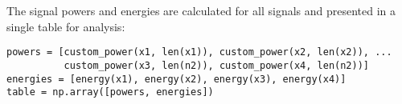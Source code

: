 
\item[(f)]
The signal powers and energies are calculated for all signals and presented in a single table for analysis:

\begin{verbatim}
powers = [custom_power(x1, len(x1)), custom_power(x2, len(x2)), ...
          custom_power(x3, len(n2)), custom_power(x4, len(n2))]
energies = [energy(x1), energy(x2), energy(x3), energy(x4)]
table = np.array([powers, energies])
\end{verbatim}